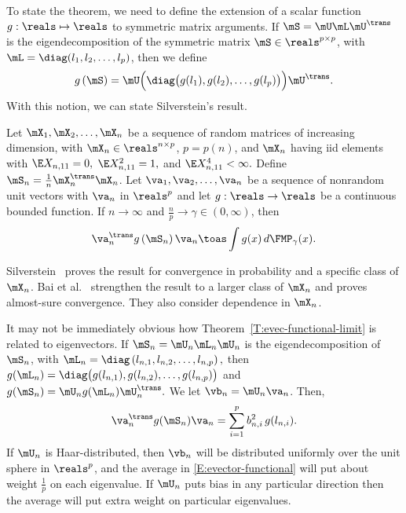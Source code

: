 To state the theorem, we need to define the extension of a scalar function
$g : \reals \mapsto \reals$ to symmetric matrix arguments.  If 
$\mS = \mU \mL \mU^\trans$ is the eigendecomposition of the symmetric
matrix $\mS \in \reals^{p \times p}$, with 
$\mL = \diag(l_1, l_2, \ldots, l_p)$, then we define
\[
    g\left( \mS \right)
        =
            \mU
            \Big(
                \diag\big(
                    g(l_1), g(l_2), \ldots, g(l_p)
                \big)
            \Big)
            \mU^\trans.
\]
With this notion, we can state Silverstein's result.

\begin{theorem}\label{T:evec-functional-limit}
    Let $\mX_1, \mX_2, \ldots, \mX_n$ be a sequence of random matrices of
    increasing dimension, with $\mX_n \in \reals^{n \times p}$, $p = p(n)$,
    and $\mX_n$ having iid elements with 
    \(
        \E X_{n,11} = 0,
    \)
    \(
        \E X_{n,11}^2 = 1,
    \)
    and
    \(
        \E X_{n,11}^4 < \infty.
    \)
    Define $\mS_n = \frac{1}{n} \mX_n^\trans \mX_n$.  Let
    $\va_1, \va_2, \ldots, \va_n$ be a sequence of nonrandom unit vectors with 
    $\va_n$ in $\reals^p$ and let $g : \reals \to \reals$ be a continuous 
    bounded function.  If $n \to \infty$ and
    $\frac{n}{p} \to \gamma \in (0,\infty)$, then
    \[
        \va_n^\trans g\left( \mS_n \right) \va_n
        \toas
        \int
            g(x)
            \,
            d\FMP_\gamma(x).
    \]
\end{theorem}

\noindent
Silverstein~\cite{silverstein1979reg} proves the result for convergence in probability and a specific class of $\mX_n$.  Bai et al.~\cite{bai2007ael} strengthen the result to a larger class of $\mX_n$ and proves almost-sure convergence.  They also consider dependence in $\mX_n$.

It may not be immediately obvious how Theorem~\ref{T:evec-functional-limit}
is related to eigenvectors.  If $\mS_n = \mU_n \mL_n \mU_n$ is the
eigendecomposition of $\mS_n$, with 
\(
    \mL_n
    = 
    \diag\left(
        l_{n,1}, l_{n,2}, \ldots, l_{n,p}
    \right),
\)
then
\(
    g(\mL_n)
    =
    \diag \big(
        g(l_{n,1}), g(l_{n,2}), \ldots, g(l_{n,p})
    \big)
\)
and
\(
    g(\mS_n)
    =
    \mU_n
    g(\mL_n)
    \mU_n^\trans.
\)
We let $\vb_n = \mU_n \va_n$.  Then,
\begin{equation}\label{E:evector-functional}
    \va_n^\trans g(\mS_n) \va_n
    =
    \sum_{i=1}^p
        b_{n,i}^2
        \,
        g( l_{n,i} ).
\end{equation}
If $\mU_n$ is Haar-distributed, then $\vb_n$ will be distributed uniformly over the unit sphere in $\reals^p$, and the average in \eqref{E:evector-functional} will put about weight $\frac{1}{p}$ on each eigenvalue.  If $\mU_n$ puts bias in any particular direction then the average will put extra weight on particular eigenvalues.

